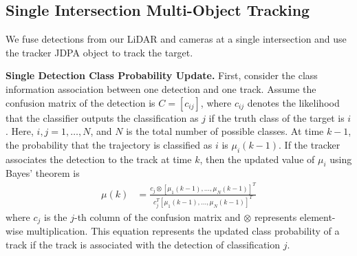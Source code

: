 \documentclass[lettersize,journal]{IEEEtran}
\begin{document}
\subsection{Single Intersection Multi-Object Tracking}

We fuse detections from our LiDAR and cameras at a single intersection and use the tracker JDPA object to track the target.

\textbf{Single Detection Class Probability Update.}
First, consider the class information association between one detection and one track. 
Assume the confusion matrix of the detection is \(C=\left[c_{i j}\right]\), where \(c_{i j}\) denotes the likelihood that the classifier outputs the classification as \(j\) if the truth class of the target is \(i\).
Here, \(i,j = 1,…, N\), and \(N\) is the total number of possible classes.
At time \(k-1\), the probability that the trajectory is classified as \(i\) is \(\mu_{i}(k-1)\).
If the tracker associates the detection to the track at time \(k\), then the updated value of \(\mu_{i}\) using Bayes' theorem is
\begin{align}
	\mu(k) & = \frac{c_{j} \otimes [ \mu_1(k-1), \ldots, \mu_N(k-1) ]^T}{c_{j}^{T} [ \mu_1(k-1), \ldots, \mu_N(k-1) ]^T}
\end{align}
where \(c_{j}\) is the \(j\)-th column of the confusion matrix and \(\otimes\) represents element-wise multiplication. 
This equation represents the updated class probability of a track if the track is associated with the detection of classification \(j\).
\end{document}
